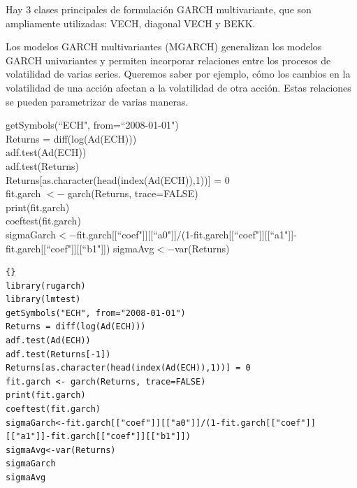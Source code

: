 	Hay 3 clases principales de formulaci\'on GARCH multivariante, que son ampliamente utilizadas: VECH, diagonal VECH y BEKK.\\
	\vspace{2mm}	
	
	Los modelos GARCH multivariantes (MGARCH) generalizan los modelos GARCH univariantes y permiten incorporar relaciones entre los procesos de volatilidad de varias series. Queremos saber por ejemplo,  c\'omo los cambios en la volatilidad de una acci\'on afectan a la volatilidad de otra acci\'on. Estas relaciones se pueden parametrizar de varias maneras. 
	


%			
			getSymbols(``ECH", from=``2008-01-01")\\
			Returns = diff(log(Ad(ECH)))\\
			adf.test(Ad(ECH))\\
			adf.test(Returns)\\
			Returns[as.character(head(index(Ad(ECH)),1))] = 0\\
			fit.garch $<-$ garch(Returns, trace=FALSE)\\
			print(fit.garch)\\
			coeftest(fit.garch)\\
			sigmaGarch$<-$fit.garch[[``coef"]][[``a0"]]/(1-fit.garch[[``coef"]][[``a1"]]-fit.garch[[``coef"]][[``b1"]])
			sigmaAvg$<-$var(Returns)\\
%			
%	
\begin{lstlisting}[title={‘Código R:\textbf{GARCH vs volatilidad promedio retorno}},basicstyle=\ttfamily]{}
library(rugarch)
library(lmtest)
getSymbols("ECH", from="2008-01-01")
Returns = diff(log(Ad(ECH)))
adf.test(Ad(ECH))
adf.test(Returns[-1])
Returns[as.character(head(index(Ad(ECH)),1))] = 0
fit.garch <- garch(Returns, trace=FALSE)
print(fit.garch)
coeftest(fit.garch)
sigmaGarch<-fit.garch[["coef"]][["a0"]]/(1-fit.garch[["coef"]][["a1"]]-fit.garch[["coef"]][["b1"]])
sigmaAvg<-var(Returns)
sigmaGarch
sigmaAvg
\end{lstlisting}
	
